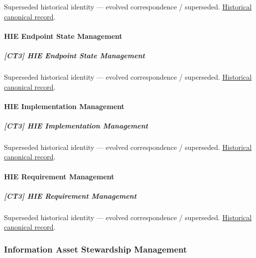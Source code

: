 \par\label{element:330d1c43856a4322a2e9f331b1a5ed20}
Superseded historical identity — evolved correspondence / superseded. \href{../../../../continuum/strategy/capability/330d1c43856a4322a2e9f331b1a5ed20.md}{Historical canonical record}.\par

\paragraph{HIE Endpoint State Management}

\subparagraph{[CT3] HIE Endpoint State Management}

\par\label{element:697de08ac49a4b7f8df7a1ed6f04210e}
Superseded historical identity — evolved correspondence / superseded. \href{../../../../continuum/strategy/capability/697de08ac49a4b7f8df7a1ed6f04210e.md}{Historical canonical record}.\par

\paragraph{HIE Implementation Management}

\subparagraph{[CT3] HIE Implementation Management}

\par\label{element:a99b4119339545a89dc54ebb216ddb85}
Superseded historical identity — evolved correspondence / superseded. \href{../../../../continuum/strategy/capability/a99b4119339545a89dc54ebb216ddb85.md}{Historical canonical record}.\par

\paragraph{HIE Requirement Management}

\subparagraph{[CT3] HIE Requirement Management}

\par\label{element:a32c8bff0c284f5c9d6ab1f46991c232}
Superseded historical identity — evolved correspondence / superseded. \href{../../../../continuum/strategy/capability/a32c8bff0c284f5c9d6ab1f46991c232.md}{Historical canonical record}.\par

\subsubsection{Information Asset Stewardship Management}

